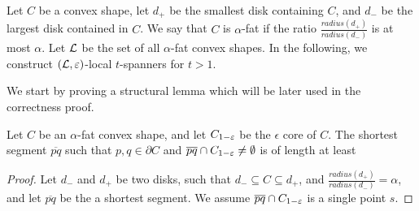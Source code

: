 \documentclass[12pt]{article}%
\begin{document}
Let $C$ be a convex shape, let $d_+$ be the smallest disk containing
$C$, and $d_-$ be the largest disk contained in $C$. We say that $C$
is $\alpha$-fat if the ratio $\frac{radius(d_+)}{radius(d_-)}$ is at
most $\alpha$. Let $\mathcal{L}$ be the set of all $\alpha$-fat convex
shapes. In the following, we construct $(\mathcal{L}, \varepsilon)$-local
$t$-spanners for $t>1$.

We start by proving a structural lemma which will be later used in the
correctness proof.

\begin{claim}
    Let $C$ be an $\alpha$-fat convex shape, and let $C_{1-\varepsilon}$ be
    the $\epsilon$ core of $C$. The shortest segment $\overline{pq}$
    such that $p,q\in\partial C$ and
    $\overline{pq}\cap C_{1-\varepsilon}\neq \emptyset$ is of length at
    least %
\end{claim}

\begin{proof}
    Let $d_-$ and $d_+$ be two disks, such that
    $d_-\subseteq C\subseteq d_+$, and
    $\frac{radius(d_+)}{radius(d_-)}=\alpha$, and let $\overline{pq}$
    be the a shortest segment. We assume
    $\overline{pq} \cap C_{1-\varepsilon}$ is a single point $s$.
\end{proof}



% 

\end{document}
